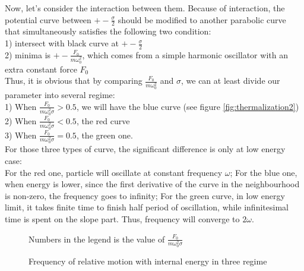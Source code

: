\documentclass[aps,pre,twocolumn
,groupedaddress]{revtex4-1}
\begin{document}
Now, let's consider the interaction between them. Because of interaction, the potential curve between $+-\frac{\sigma}{2}$ should be modified to another parabolic curve that simultaneously satisfies the following two condition:\\
1) intersect with black curve at $+-\frac{\sigma}{2}$\\
2) minima is $+-\frac{F_0}{m\omega_0^2}$, which comes from a simple harmonic oscillator with an extra constant force $F_0$\\
Thus, it is obvious that by comparing $\frac{F_0}{m\omega_0^2}$ and $\sigma$, we can at least divide our parameter into several regime:\\
1) When $\frac{F_0}{m\omega_0^2\sigma}>0.5$, we will have the blue curve (see figure \ref{fig:thermalization2})\\
2) When $\frac{F_0}{m\omega_0^2\sigma}<0.5$, the red curve\\
3) When $\frac{F_0}{m\omega_0^2\sigma}=0.5$, the green one.\\
For those three types of curve, the significant difference is only at low energy case:\\
For the red one, particle will oscillate at constant frequency $\omega$;
For the blue one, when energy is lower, since the first derivative of the curve in the neighbourhood is non-zero, the frequency goes to infinity;
For the green curve, in low energy limit, it takes finite time to finish half period of oscillation, while infinitesimal time is spent on the slope part. Thus, frequency will converge to  $2\omega$.

\begin{figure}
\centering
\caption{Frequency of relative motion with internal energy in three regime} Numbers in the legend is the value of $\frac{F_0}{m\omega_0^2\sigma}$
\label{fig:thermalization3}
\end{figure}
\cite{Tsuchiya2000}



 
 
\end{document}
